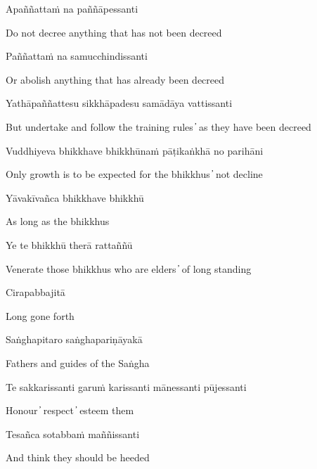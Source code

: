 Apaññattaṁ na paññāpessanti

\begin{cprenglish}
  Do not decree anything that has not been decreed
\end{cprenglish}

Paññattaṁ na samucchindissanti

\begin{cprenglish}
  Or abolish anything that has already been decreed
\end{cprenglish}

Yathāpaññattesu sikkhāpadesu samādāya vattissanti

\begin{cprenglish}
  But undertake and follow the training rules  ̓  as they have been decreed
\end{cprenglish}

Vuddhiyeva bhikkhave bhikkhūnaṁ pāṭikaṅkhā no parihāni

\begin{cprenglish}
  Only growth is to be expected for the bhikkhus  ̓  not decline
\end{cprenglish}

Yāvakīvañca bhikkhave bhikkhū

\begin{cprenglish}
  As long as the bhikkhus
\end{cprenglish}

Ye te bhikkhū therā rattaññū

\begin{cprenglish}
  Venerate those bhikkhus who are elders  ̓  of long standing
\end{cprenglish}

Cirapabbajitā

\begin{cprenglish}
  Long gone forth
\end{cprenglish}

Saṅghapitaro saṅghapariṇāyakā

\begin{cprenglish}
  Fathers and guides of the Saṅgha
\end{cprenglish}

Te sakkarissanti garuṁ karissanti mānessanti pūjessanti

\begin{cprenglish}
  Honour  ̓  respect  ̓  esteem them
\end{cprenglish}

Tesañca sotabbaṁ maññissanti

\begin{cprenglish}
  And think they should be heeded
\end{cprenglish}

